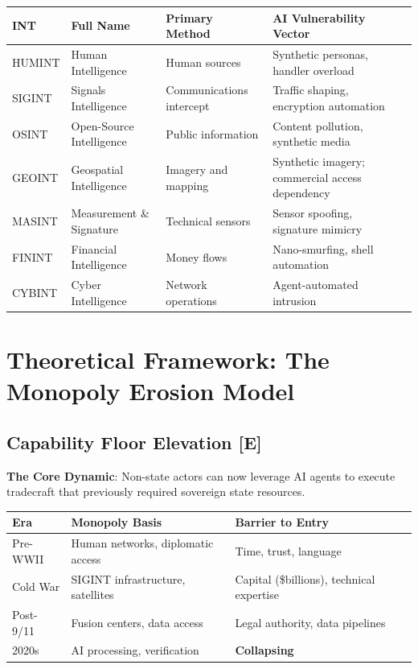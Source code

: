 \documentclass[11pt,letterpaper]{article}
\begin{document}
\begin{center}
\small
\begin{tabularx}{\linewidth}{ZY{0.48}Y{0.96}Y{0.96}Y{1.6}}
\toprule
\textbf{INT} & \textbf{Full Name} & \textbf{Primary Method} & \textbf{AI Vulnerability Vector} \\
\midrule
HUMINT & Human Intelligence & Human sources & Synthetic personas, handler overload \\
SIGINT & Signals Intelligence & Communications intercept & Traffic shaping, encryption automation \\
OSINT & Open-Source Intelligence & Public information & Content pollution, synthetic media \\
GEOINT & Geospatial Intelligence & Imagery and mapping & Synthetic imagery; commercial access dependency \\
MASINT & Measurement \& Signature & Technical sensors & Sensor spoofing, signature mimicry \\
FININT & Financial Intelligence & Money flows & Nano-smurfing, shell automation \\
CYBINT & Cyber Intelligence & Network operations & Agent-automated intrusion \\
\bottomrule
\end{tabularx}
\end{center}

\section{Theoretical Framework: The Monopoly Erosion Model}

\subsection{Capability Floor Elevation [E]}

\textbf{The Core Dynamic}: Non-state actors can now leverage AI agents to execute tradecraft that previously required sovereign state resources.

\begin{center}
\small
\begin{tabularx}{\linewidth}{ZY{0.5}Y{1}Y{1.5}}
\toprule
\textbf{Era} & \textbf{Monopoly Basis} & \textbf{Barrier to Entry} \\
\midrule
Pre-WWII & Human networks, diplomatic access & Time, trust, language \\
Cold War & SIGINT infrastructure, satellites & Capital (\$billions), technical expertise \\
Post-9/11 & Fusion centers, data access & Legal authority, data pipelines \\
2020s & AI processing, verification & \textbf{Collapsing} \\
\bottomrule
\end{tabularx}
\end{center}
\end{document}
